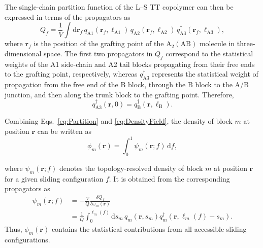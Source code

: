     The single-chain partition function of the L--S TT copolymer can then be expressed in terms of the propagators as
    \begin{equation}
        Q_f = \frac{1}{V}
        \int \mathrm d\bm r_f \,
        q_{\mathrm{A1}}(\bm r_f,\ell_{\mathrm{A1}})
        \,q_{\mathrm{A2}}(\bm r_f,\ell_{\mathrm{A2}})
        \,q_{\mathrm{A3}}^\dagger(\bm r_f,\ell_{\mathrm{A3}}),
        \label{eq:FixedPartition}
    \end{equation}
    where $\bm r_f$ is the position of the grafting point of the $\mathrm{A_2(AB)}$ molecule in three-dimensional space.
    The first two propagators in $Q_f$ correspond to the statistical weights of the A1 side-chain and A2 tail blocks propagating from their free ends to the grafting point, respectively, whereas $q^\dagger_{\mathrm{A3}}$ represents the statistical weight of propagation from the free end of the B block, through the B block to the A/B junction, and then along the trunk block to the grafting point.
    Therefore,
    \begin{equation}
        q_{\mathrm{A3}}^\dagger(\bm r, 0) = q_{\mathrm{B}}^\dagger(\bm r, \ell_{\mathrm{B}}).
    \end{equation}


    Combining Eqs.~\eqref{eq:Partition} and \eqref{eq:DensityField}, the density of block $m$ at position $\bm r$ can be written as
    \begin{equation}
        \phi_m(\bm r)
        =
        \int_0^1
        \psi_m(\bm r;f)\,\mathrm df,
        \label{eq:BlockDensity}
    \end{equation}
    
    where $\psi_m(\bm r;f)$ denotes the topology-resolved density of block $m$ at position $\bm r$ for a given sliding configuration $f$. 
    It is obtained from the corresponding propagators as
    \begin{equation}
        \begin{aligned}
            \psi_m(\bm r;f)
            &=
            -\frac{V}{Q}
            \frac{\delta Q_f}{\delta\omega_m(\bm r)}
            \\
            &=
            \frac{1}{Q}
            \int_0^{\ell_m(f)}
            \mathrm ds_m\,
            q_m(\bm r,s_m)
            q_m^\dagger
            \left(
                \bm r,\ell_m(f)-s_m
            \right).
        \end{aligned}
        \label{eq:TopologyDensity}
    \end{equation}
    Thus, $\phi_m(\bm r)$ contains the statistical contributions from all accessible sliding configurations.
    


